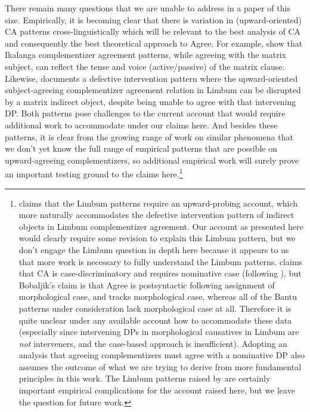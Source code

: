 \documentclass[output=paper
,modfonts
,nonflat
]{langsci/langscibook}
\begin{document}
There remain many questions that we are unable to address in a paper of this size. Empirically, it is becoming clear that there is variation in (upward-oriented) CA patterns cross-linguistically which will be relevant to the best analysis of CA and consequently the best theoretical approach to Agree. For example, \citet{LetsholoSafir:2017} show that Ikalanga complementizer agreement patterns, while agreeing with the matrix subject, can reflect the tense and voice (active/passive) of the matrix clause. Likewise, \citet{Nformi:2017} documents a defective intervention pattern where the upward-oriented subject-agreeing complementizer agreement relation in Limbum can be disrupted by a matrix indirect object, despite being unable to agree with that intervening DP. Both patterns pose challenges to the current account that would require additional work to accommodate under our claims here. And besides these patterns, it is clear from the growing range of work on similar phenomena that we don't yet know the full range of empirical patterns that are possible on upward-agreeing complementizers, so additional empirical work will surely prove an important testing ground to the claims here.\footnote{\citet{Nformi:2017} claims that the Limbum patterns require an upward-probing account, which more naturally accommodates the defective intervention pattern of indirect objects in Limbum complementizer agreement. Our account as presented here would clearly require some revision to explain this Limbum pattern, but we don't engage the Limbum question in depth here because it appears to us that more work is necessary to fully understand the Limbum patterns. \citet{Nformi:2017} claims that CA is case-discriminatory and requires nominative case (following \citealt{Bobaljik:2008}), but Bobaljik's claim is that Agree is postsyntactic following assignment of morphological case, and tracks morphological case, whereas all of the Bantu patterns under consideration lack morphological case at all. Therefore it is quite unclear under any available account how to accommodate these data (especially since intervening DPs in morphological causatives in Limbum are \textit{not} interveners, and the case-based approach is insufficient). Adopting an analysis that agreeing complementizers must agree with a nominative DP also assumes the outcome of what we are trying to derive from more fundamental principles in this work. The Limbum patterns raised by \citet{Nformi:2017} are certainly important empirical complications for the account raised here, but we leave the question for future work.} 
\end{document}
